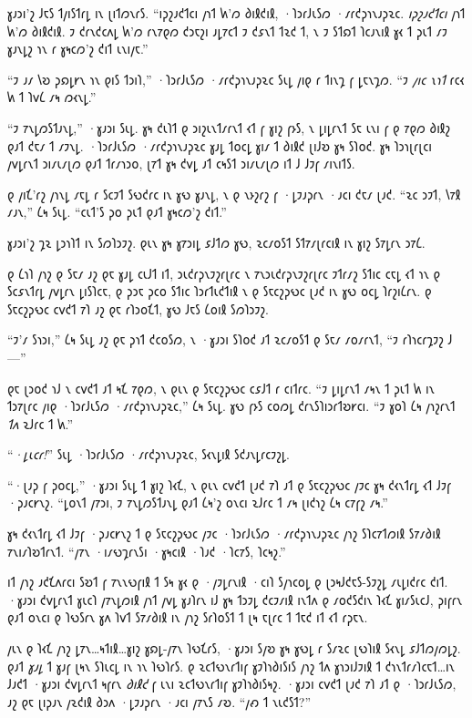 𐑣𐑨𐑮𐑦'𐑟 𐑓𐑱𐑕 𐑑𐑢𐑦𐑕𐑑𐑩𐑛 𐑦𐑯 𐑚𐑦𐑑𐑼𐑯𐑩𐑕. “𐑦𐑜𐑟𐑨𐑒𐑑𐑤𐑦 𐑢𐑪𐑑 𐑿'𐑼 𐑔𐑦𐑙𐑒𐑦𐑙, ·𐑐𐑮𐑩𐑓𐑧𐑕𐑼 ·𐑥𐑩𐑒𐑜𐑪𐑯𐑨𐑜𐑷𐑤. \emph{𐑦𐑜𐑟𐑨𐑒𐑑𐑤𐑦} 𐑢𐑪𐑑 𐑿'𐑼 𐑔𐑦𐑙𐑒𐑦𐑙. 𐑲 𐑒𐑩𐑯𐑒𐑤𐑵𐑛 𐑿'𐑼 𐑩𐑯𐑳𐑞𐑼 𐑒𐑮𐑱𐑟𐑦 𐑨𐑛𐑳𐑤𐑑 𐑲 𐑒𐑭𐑯𐑑 𐑑𐑷𐑒 𐑑, 𐑯 𐑲 𐑕𐑑𐑸𐑑 𐑐𐑤𐑨𐑯𐑦𐑙 𐑣𐑬 𐑑 𐑜𐑧𐑑 𐑥𐑲 𐑣𐑨𐑯𐑛𐑟 𐑪𐑯 𐑩 𐑣𐑰𐑤𐑼'𐑟 𐑒𐑦𐑑 𐑧𐑯𐑦𐑢𐑱.”

“𐑲 𐑨𐑥 𐑘𐑹 𐑜𐑸𐑛𐑾𐑯 𐑪𐑯 𐑞𐑦𐑕 𐑑𐑮𐑦𐑐,” ·𐑐𐑮𐑩𐑓𐑧𐑕𐑼 ·𐑥𐑩𐑒𐑜𐑪𐑯𐑨𐑜𐑷𐑤 𐑕𐑧𐑛 𐑢𐑦𐑞 𐑩 𐑑𐑦𐑯𐑡 𐑝 𐑛𐑱𐑯𐑡𐑼. “𐑲 \emph{𐑢𐑦𐑤 𐑯𐑪𐑑} 𐑩𐑤𐑬 𐑿 𐑑 𐑐𐑫𐑖 𐑥𐑰 𐑼𐑬𐑯𐑛.”

“𐑲 𐑳𐑯𐑛𐑼𐑕𐑑𐑨𐑯𐑛,” ·𐑣𐑨𐑮𐑦 𐑕𐑧𐑛. 𐑣𐑰 𐑒𐑧𐑐𐑑 𐑞 𐑮𐑦𐑟𐑧𐑯𐑑𐑥𐑩𐑯𐑑 𐑬𐑑 𐑝 𐑣𐑦𐑟 𐑝𐑶𐑕, 𐑯 𐑛𐑦𐑛𐑩𐑯𐑑 𐑕𐑱 𐑧𐑯𐑦 𐑝 𐑞 𐑳𐑞𐑼 𐑔𐑦𐑙𐑟 𐑞𐑨𐑑 𐑒𐑱𐑥 𐑑 𐑥𐑲𐑯𐑛. ·𐑐𐑮𐑩𐑓𐑧𐑕𐑼 ·𐑥𐑩𐑒𐑜𐑪𐑯𐑨𐑜𐑷𐑤 𐑣𐑨𐑛 𐑑𐑴𐑤𐑛 𐑣𐑦𐑥 𐑑 𐑔𐑦𐑙𐑒 𐑚𐑦𐑓𐑹 𐑣𐑰 𐑕𐑐𐑴𐑒. 𐑣𐑰 𐑐𐑮𐑪𐑚𐑩𐑚𐑤𐑦 𐑢𐑫𐑛𐑩𐑯𐑑 𐑮𐑦𐑥𐑧𐑥𐑚𐑼 𐑞𐑨𐑑 𐑑𐑩𐑥𐑪𐑮𐑴, 𐑚𐑳𐑑 𐑣𐑰 𐑒𐑫𐑛 𐑨𐑑 𐑤𐑰𐑕𐑑 𐑮𐑦𐑥𐑧𐑥𐑚𐑼 𐑦𐑑 𐑓 𐑓𐑲𐑝 𐑥𐑦𐑯𐑦𐑑𐑕.

𐑞 𐑢𐑦𐑗'𐑩𐑟 𐑢𐑪𐑯𐑛 𐑥𐑱𐑛 𐑩 𐑕𐑤𐑲𐑑 𐑕𐑻𐑒𐑩𐑤 𐑦𐑯 𐑣𐑻 𐑣𐑨𐑯𐑛, 𐑯 𐑞 𐑯𐑶𐑟𐑩𐑟 𐑝 ·𐑛𐑲𐑨𐑜𐑩𐑯 ·𐑨𐑤𐑦 𐑒𐑱𐑥 𐑚𐑨𐑒. “𐑷𐑤 𐑮𐑲𐑑, 𐑘𐑳𐑙 𐑥𐑨𐑯,” 𐑖𐑰 𐑕𐑧𐑛. “𐑤𐑧𐑑'𐑕 𐑜𐑴 𐑜𐑧𐑑 𐑞𐑨𐑑 𐑣𐑰𐑤𐑼'𐑟 𐑒𐑦𐑑.”

𐑣𐑨𐑮𐑦'𐑟 𐑡𐑷 𐑛𐑮𐑪𐑐𐑑 𐑦𐑯 𐑕𐑼𐑐𐑮𐑲𐑟. 𐑞𐑧𐑯 𐑣𐑰 𐑣𐑳𐑮𐑦𐑛 𐑭𐑓𐑑𐑼 𐑣𐑻, 𐑷𐑤𐑥𐑴𐑕𐑑 𐑕𐑑𐑳𐑥𐑚𐑩𐑤𐑦𐑙 𐑦𐑯 𐑣𐑦𐑟 𐑕𐑳𐑛𐑩𐑯 𐑮𐑳𐑖.

\later

𐑞 𐑖𐑪𐑐 𐑢𐑪𐑟 𐑞 𐑕𐑱𐑥 𐑨𐑟 𐑞𐑱 𐑣𐑨𐑛 𐑤𐑧𐑓𐑑 𐑦𐑑, 𐑮𐑧𐑒𐑩𐑜𐑯𐑲𐑟𐑩𐑚𐑩𐑤 𐑯 𐑳𐑯𐑮𐑧𐑒𐑩𐑜𐑯𐑲𐑟𐑩𐑚𐑩𐑤 𐑲𐑑𐑩𐑥𐑟 𐑕𐑑𐑦𐑤 𐑤𐑱𐑛 𐑬𐑑 𐑪𐑯 𐑞 𐑕𐑤𐑭𐑯𐑑𐑩𐑛 𐑢𐑫𐑛𐑩𐑯 𐑛𐑦𐑕𐑐𐑤𐑱, 𐑞 𐑜𐑮𐑱 𐑜𐑤𐑴 𐑕𐑑𐑦𐑤 𐑐𐑮𐑩𐑑𐑧𐑒𐑑𐑦𐑙 𐑯 𐑞 𐑕𐑱𐑤𐑟𐑜𐑻𐑤 𐑚𐑨𐑒 𐑦𐑯 𐑣𐑻 𐑴𐑤𐑛 𐑐𐑩𐑟𐑦𐑖𐑩𐑯. 𐑞 𐑕𐑱𐑤𐑟𐑜𐑻𐑤 𐑤𐑫𐑒𐑑 𐑳𐑐 𐑨𐑟 𐑞𐑱 𐑩𐑐𐑮𐑴𐑗𐑑, 𐑣𐑻 𐑓𐑱𐑕 𐑖𐑴𐑦𐑙 𐑕𐑼𐑐𐑮𐑲𐑟.

“𐑲'𐑥 𐑕𐑪𐑮𐑦,” 𐑖𐑰 𐑕𐑧𐑛 𐑨𐑟 𐑞𐑱 𐑜𐑪𐑑 𐑒𐑤𐑴𐑕𐑼, 𐑯 ·𐑣𐑨𐑮𐑦 𐑕𐑐𐑴𐑒 𐑨𐑑 𐑷𐑤𐑥𐑴𐑕𐑑 𐑞 𐑕𐑱𐑥 𐑥𐑴𐑥𐑩𐑯𐑑, “𐑲 𐑩𐑐𐑪𐑤𐑩𐑡𐑲𐑟 𐑓—”

𐑞𐑱 𐑚𐑮𐑴𐑒 𐑪𐑓 𐑯 𐑤𐑫𐑒𐑑 𐑨𐑑 𐑰𐑗 𐑳𐑞𐑼, 𐑯 𐑞𐑧𐑯 𐑞 𐑕𐑱𐑤𐑟𐑜𐑻𐑤 𐑤𐑭𐑓𐑑 𐑩 𐑤𐑦𐑑𐑩𐑤. “𐑲 𐑛𐑦𐑛𐑩𐑯𐑑 𐑥𐑰𐑯 𐑑 𐑜𐑧𐑑 𐑿 𐑦𐑯 𐑑𐑮𐑳𐑚𐑩𐑤 𐑢𐑦𐑞 ·𐑐𐑮𐑩𐑓𐑧𐑕𐑼 ·𐑥𐑩𐑒𐑜𐑪𐑯𐑨𐑜𐑷𐑤,” 𐑖𐑰 𐑕𐑧𐑛. 𐑣𐑻 𐑝𐑶𐑕 𐑤𐑴𐑼𐑛 𐑒𐑩𐑯𐑕𐑐𐑦𐑮𐑩𐑑𐑹𐑾𐑤𐑦. “𐑲 𐑣𐑴𐑐 𐑖𐑰 𐑢𐑪𐑟𐑩𐑯𐑑 \emph{𐑑𐑵} 𐑷𐑓𐑩𐑤 𐑑 𐑿.”

“\emph{·𐑛𐑧𐑤𐑩!}” 𐑕𐑧𐑛 ·𐑐𐑮𐑩𐑓𐑧𐑕𐑼 ·𐑥𐑩𐑒𐑜𐑪𐑯𐑨𐑜𐑷𐑤, 𐑕𐑬𐑯𐑛𐑦𐑙 𐑕𐑒𐑨𐑯𐑛𐑩𐑤𐑲𐑟𐑛.

“·𐑚𐑨𐑜 𐑝 𐑜𐑴𐑤𐑛,” ·𐑣𐑨𐑮𐑦 𐑕𐑧𐑛 𐑑 𐑣𐑦𐑟 𐑐𐑬𐑗, 𐑯 𐑞𐑧𐑯 𐑤𐑫𐑒𐑑 𐑚𐑨𐑒 𐑳𐑐 𐑨𐑑 𐑞 𐑕𐑱𐑤𐑟𐑜𐑻𐑤 𐑢𐑲𐑤 𐑣𐑰 𐑒𐑬𐑯𐑑𐑩𐑛 𐑬𐑑 𐑓𐑲𐑝 ·𐑜𐑨𐑤𐑾𐑯𐑟. “𐑛𐑴𐑯𐑑 𐑢𐑳𐑮𐑦, 𐑲 𐑳𐑯𐑛𐑼𐑕𐑑𐑨𐑯𐑛 𐑞𐑨𐑑 𐑖𐑰'𐑟 𐑴𐑯𐑤𐑦 𐑷𐑓𐑩𐑤 𐑑 𐑥𐑰 𐑚𐑦𐑒𐑪𐑟 𐑖𐑰 𐑤𐑳𐑝𐑟 𐑥𐑰.”

𐑣𐑰 𐑒𐑬𐑯𐑑𐑩𐑛 𐑬𐑑 𐑓𐑲𐑝 ·𐑜𐑨𐑤𐑾𐑯𐑟 𐑑 𐑞 𐑕𐑱𐑤𐑟𐑜𐑻𐑤 𐑢𐑲𐑤 ·𐑐𐑮𐑩𐑓𐑧𐑕𐑼 ·𐑥𐑩𐑒𐑜𐑪𐑯𐑨𐑜𐑷𐑤 𐑢𐑪𐑟 𐑕𐑐𐑤𐑳𐑑𐑼𐑦𐑙 𐑕𐑳𐑥𐑔𐑦𐑙 𐑳𐑯𐑦𐑥𐑐𐑹𐑑𐑩𐑯𐑑. “𐑢𐑳𐑯 ·𐑦𐑥𐑻𐑡𐑩𐑯𐑕𐑦 ·𐑣𐑰𐑤𐑦𐑙 ·𐑐𐑨𐑒 ·𐑐𐑤𐑳𐑕, 𐑐𐑤𐑰𐑟.”

𐑦𐑑 𐑢𐑪𐑟 𐑨𐑒𐑗𐑵𐑩𐑤𐑦 𐑕𐑹𐑑 𐑝 𐑳𐑯𐑯𐑻𐑝𐑦𐑙 𐑑 𐑕𐑰 𐑣𐑬 𐑞 ·𐑢𐑲𐑛𐑩𐑯𐑦𐑙 ·𐑤𐑦𐑐 𐑕𐑢𐑪𐑤𐑴𐑛 𐑞 𐑚𐑮𐑰𐑓𐑒𐑱𐑕-𐑕𐑲𐑟𐑛 𐑥𐑧𐑛𐑦𐑒𐑩𐑤 𐑒𐑦𐑑. ·𐑣𐑨𐑮𐑦 𐑒𐑫𐑛𐑩𐑯𐑑 𐑣𐑧𐑤𐑐 𐑢𐑳𐑯𐑛𐑼𐑦𐑙 𐑢𐑪𐑑 𐑢𐑫𐑛 𐑣𐑨𐑐𐑩𐑯 𐑦𐑓 𐑣𐑰 𐑑𐑮𐑲𐑛 𐑒𐑤𐑲𐑥𐑦𐑙 𐑦𐑯𐑑𐑵 𐑞 𐑥𐑴𐑒𐑕𐑒𐑦𐑯 𐑐𐑬𐑗 𐑣𐑦𐑥𐑕𐑧𐑤𐑓, 𐑜𐑦𐑝𐑩𐑯 𐑞𐑨𐑑 𐑴𐑯𐑤𐑦 𐑞 𐑐𐑻𐑕𐑩𐑯 𐑣𐑵 𐑐𐑫𐑑 𐑕𐑳𐑥𐑔𐑦𐑙 𐑦𐑯 𐑢𐑪𐑟 𐑕𐑩𐑐𐑴𐑕𐑑 𐑑 𐑚𐑰 𐑱𐑚𐑩𐑤 𐑑 𐑑𐑱𐑒 𐑦𐑑 𐑬𐑑 𐑩𐑜𐑱𐑯.

𐑢𐑧𐑯 𐑞 𐑐𐑬𐑗 𐑢𐑪𐑟 𐑛𐑳𐑯…𐑰𐑑𐑦𐑙…𐑣𐑦𐑟 𐑣𐑸𐑛-𐑢𐑳𐑯 𐑐𐑻𐑗𐑩𐑕, ·𐑣𐑨𐑮𐑦 𐑕𐑢𐑹 𐑣𐑰 𐑣𐑻𐑛 𐑩 𐑕𐑥𐑷𐑤 𐑚𐑻𐑐𐑦𐑙 𐑕𐑬𐑯𐑛 𐑭𐑓𐑑𐑼𐑢𐑼𐑛𐑟. 𐑞𐑨𐑑 \emph{𐑣𐑨𐑛} 𐑑 𐑣𐑨𐑝 𐑚𐑰𐑯 𐑕𐑐𐑧𐑤𐑛 𐑦𐑯 𐑪𐑯 𐑐𐑻𐑐𐑩𐑕. 𐑞 𐑷𐑤𐑑𐑻𐑯𐑩𐑑𐑦𐑝 𐑣𐑲𐑐𐑪𐑔𐑦𐑕𐑦𐑕 𐑢𐑪𐑟 𐑑𐑵 𐑣𐑪𐑮𐑦𐑓𐑲𐑦𐑙 𐑑 𐑒𐑪𐑯𐑑𐑩𐑥𐑐𐑤𐑱𐑑…𐑦𐑯 𐑓𐑨𐑒𐑑 ·𐑣𐑨𐑮𐑦 𐑒𐑫𐑛𐑩𐑯𐑑 𐑰𐑝𐑩𐑯 \emph{𐑔𐑦𐑙𐑒} 𐑝 𐑧𐑯𐑦 𐑷𐑤𐑑𐑻𐑯𐑩𐑑𐑦𐑝 𐑣𐑲𐑐𐑪𐑔𐑦𐑕𐑰𐑟. ·𐑣𐑨𐑮𐑦 𐑤𐑫𐑒𐑑 𐑚𐑨𐑒 𐑳𐑐 𐑨𐑑 𐑞 ·𐑐𐑮𐑩𐑓𐑧𐑕𐑼, 𐑨𐑟 𐑞𐑱 𐑚𐑦𐑜𐑨𐑯 𐑢𐑷𐑒𐑦𐑙 𐑔𐑮𐑵 ·𐑛𐑲𐑨𐑜𐑩𐑯 ·𐑨𐑤𐑦 𐑢𐑳𐑯𐑕 𐑥𐑹. “𐑢𐑺 𐑑 𐑯𐑧𐑒𐑕𐑑?”

